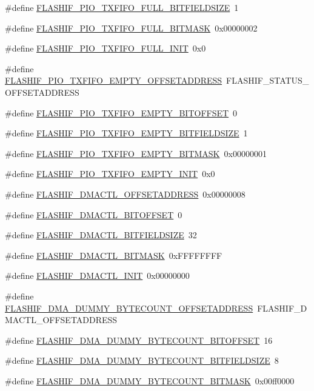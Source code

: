 \begin{DoxyCompactItemize}
\#define \hyperlink{a00552_a8738ff78abd92f75afec69ddf9b79127}{FLASHIF\_\-PIO\_\-TXFIFO\_\-FULL\_\-BITFIELDSIZE}~1
\item 
\#define \hyperlink{a00552_aa26b57043a6d301fd50bb9bc061094c3}{FLASHIF\_\-PIO\_\-TXFIFO\_\-FULL\_\-BITMASK}~0x00000002
\item 
\#define \hyperlink{a00552_a5179c5b334d572f63a11ae08582ad84f}{FLASHIF\_\-PIO\_\-TXFIFO\_\-FULL\_\-INIT}~0x0
\item 
\#define \hyperlink{a00552_a257c26a9521ec0b84b87da8e0b4c2060}{FLASHIF\_\-PIO\_\-TXFIFO\_\-EMPTY\_\-OFFSETADDRESS}~FLASHIF\_\-STATUS\_\-OFFSETADDRESS
\item 
\#define \hyperlink{a00552_a82e9d2cfd3aff2a870e9f700c49abd26}{FLASHIF\_\-PIO\_\-TXFIFO\_\-EMPTY\_\-BITOFFSET}~0
\item 
\#define \hyperlink{a00552_a59b3a2a8bfc69e6b46a37b52609f69b8}{FLASHIF\_\-PIO\_\-TXFIFO\_\-EMPTY\_\-BITFIELDSIZE}~1
\item 
\#define \hyperlink{a00552_aad93a3f58543a53f70b94f3215c80164}{FLASHIF\_\-PIO\_\-TXFIFO\_\-EMPTY\_\-BITMASK}~0x00000001
\item 
\#define \hyperlink{a00552_a77b19157fd4eb5f2d0a199047d4e82da}{FLASHIF\_\-PIO\_\-TXFIFO\_\-EMPTY\_\-INIT}~0x0
\item 
\#define \hyperlink{a00552_a43c94858b817a76753c1683ef103ac02}{FLASHIF\_\-DMACTL\_\-OFFSETADDRESS}~0x00000008
\item 
\#define \hyperlink{a00552_a04cb5e907b48bf17431a240b3099267d}{FLASHIF\_\-DMACTL\_\-BITOFFSET}~0
\item 
\#define \hyperlink{a00552_afd75474f848ec745f1968b4f2d13fd7a}{FLASHIF\_\-DMACTL\_\-BITFIELDSIZE}~32
\item 
\#define \hyperlink{a00552_a3e47398764d306778ed4b9cf0ea8e725}{FLASHIF\_\-DMACTL\_\-BITMASK}~0xFFFFFFFF
\item 
\#define \hyperlink{a00552_a7f8fe0fd993f0a79e20892dd3e791be2}{FLASHIF\_\-DMACTL\_\-INIT}~0x00000000
\item 
\#define \hyperlink{a00552_a35fc727c3db33b4445360f6b9ce82ffd}{FLASHIF\_\-DMA\_\-DUMMY\_\-BYTECOUNT\_\-OFFSETADDRESS}~FLASHIF\_\-DMACTL\_\-OFFSETADDRESS
\item 
\#define \hyperlink{a00552_a6d1f5e09459aa628ff9c5fb58b26f160}{FLASHIF\_\-DMA\_\-DUMMY\_\-BYTECOUNT\_\-BITOFFSET}~16
\item 
\#define \hyperlink{a00552_ac3fcc6db65b5467aaffd84fe51158ad2}{FLASHIF\_\-DMA\_\-DUMMY\_\-BYTECOUNT\_\-BITFIELDSIZE}~8
\item 
\#define \hyperlink{a00552_a833f2a7980292d910de322e3eca717c3}{FLASHIF\_\-DMA\_\-DUMMY\_\-BYTECOUNT\_\-BITMASK}~0x00ff0000

\end{DoxyCompactItemize}
